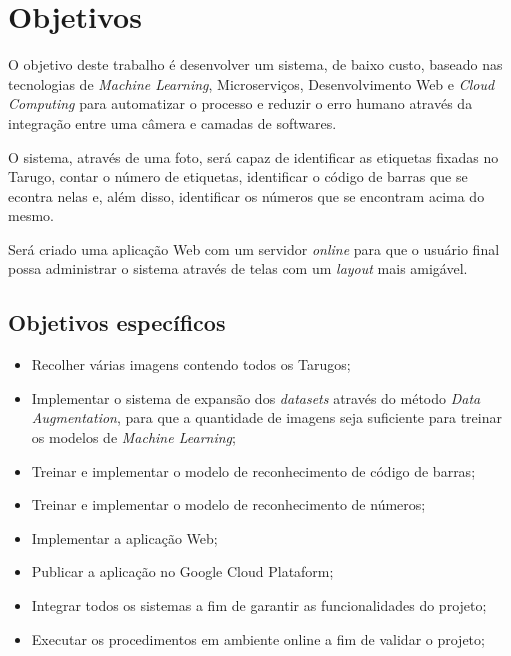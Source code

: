 \section{Objetivos} 

O objetivo deste trabalho é desenvolver um sistema, de baixo custo, baseado nas tecnologias de \textit{Machine Learning}, Microserviços, Desenvolvimento Web e \textit{Cloud Computing} para automatizar o processo e reduzir o erro humano através da integração entre uma câmera e camadas de softwares. 

O sistema, através de uma foto, será capaz de identificar as etiquetas fixadas no Tarugo, contar o número de etiquetas, identificar o código de barras que se econtra nelas e, além disso, identificar os números que se encontram acima do mesmo.

Será criado uma aplicação Web com um servidor \textit{online} para que o usuário final possa administrar o sistema através de telas com um \textit{layout} mais amigável.

\subsection{Objetivos específicos}

\begin{itemize}
	\item Recolher várias imagens contendo todos os Tarugos;
	\item Implementar o sistema de expansão dos \textit{datasets} através do método \textit{Data Augmentation}, para que a quantidade de imagens seja suficiente para treinar os modelos de \textit{Machine Learning};
	\item Treinar e implementar o modelo de reconhecimento de código de barras;
	\item Treinar e implementar o modelo de reconhecimento de números;
	\item Implementar a aplicação Web;
	\item Publicar a aplicação no Google Cloud Plataform;
	\item Integrar todos os sistemas a fim de garantir as funcionalidades do projeto;
	\item Executar os procedimentos em ambiente online a fim de validar o projeto;
\end{itemize}


